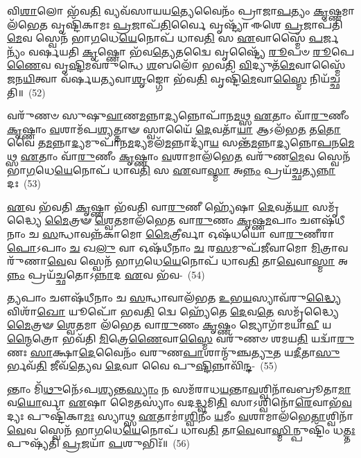 𑌵𑌿\-\ul{𑌶𑌾}\-𑌲𑍋 𑌭᳴𑌵\-\ul{𑌤𑌿} 𑌵𑍍𑌯𑌵᳴𑌸𑌾𑌯𑌯\-\ul{𑌤𑍍𑌯𑍇}\-𑌵𑍈𑌨𑌂᳴ 𑌪𑍍𑌰𑌾𑌜𑌾\-\ul{𑌪}\-𑌤𑍍𑌯𑌂 \ul{𑌕𑍃}\-𑌷𑍍𑌣𑌮𑌾\-𑌲᳴𑌭𑍇\-\ul{𑌤} 𑌵𑍃𑌷𑍍𑌟𑌿᳴𑌕𑌾𑌮𑌃 \ul{𑌪𑍍𑌰}\-𑌜𑌾𑌪᳴\-\ul{𑌤𑌿}\-𑌰𑍍𑌵𑍈 𑌵𑍃𑌷𑍍𑌟𑍍𑌯𑌾᳴ 𑌈𑌶𑍇 \ul{𑌪𑍍𑌰}\-𑌜𑌾𑌪᳴𑌤𑌿\-\ul{𑌮𑍇}\-𑌵 𑌸𑍍𑌵𑍇𑌨᳴ 𑌭𑌾\-\ul{𑌗}\-𑌧𑍇\-\ul{𑌯𑍇}\-𑌨𑍋𑌪᳴ 𑌧𑌾𑌵\-\ul{𑌤𑌿} 𑌸 \ul{𑌏}\-𑌵𑌾𑌸𑍍𑌮𑍈᳴ \ul{𑌪}\-𑌰𑍍𑌜𑌨𑍍𑌯𑌂᳴ 𑌵𑌰𑍍\mbox{}𑌷𑌯𑌤𑌿 \ul{𑌕𑍃}\-𑌷𑍍𑌣𑍋 𑌭᳴𑌵\-\ul{𑌤𑍍𑌯𑍇}\-𑌤𑌦𑍍𑌵𑍈 𑌵𑍃𑌷𑍍𑌟𑍍𑌯𑍈᳴ \ul{𑌰𑍂}\-𑌪𑍞 \ul{𑌰𑍂}\-𑌪𑍇\-\ul{𑌣𑍈}\-𑌵 𑌵𑍃\-\ul{𑌷𑍍𑌟𑌿}\-𑌮𑌵᳴\-𑌰𑍁𑌨𑍍𑌧𑍇 \ul{𑌶}\-𑌬𑌲𑍋᳴ 𑌭𑌵𑌤𑌿 \ul{𑌵𑌿}\-𑌦𑍍𑌯𑍁𑌤᳴\-\ul{𑌮𑍇}\-𑌵𑌾𑌸𑍍𑌮𑍈᳴ 𑌜𑌨\-\ul{𑌯𑌿}\-𑌤𑍍𑌵𑌾 𑌵᳴𑌰𑍍\mbox{}𑌷𑌯𑌤𑍍𑌯𑌵𑌾\-\ul{𑌶𑍃}\-𑌙𑍍𑌗𑍋 𑌭᳴𑌵\-\ul{𑌤𑌿} 𑌵𑍃𑌷𑍍𑌟𑌿᳴\-\ul{𑌮𑍇}\-𑌵𑌾\-\ul{𑌸𑍍𑌮𑍈} 𑌨𑌿𑌯᳴𑌚𑍍𑌛𑌤𑌿॥~(52)

{\anuvakamend[\-\ul{𑌶𑍃}\-𑌣𑌾𑌤𑌿᳴ 𑌮𑌿\-\ul{𑌥𑍁}\-𑌨𑌾𑌨𑌾॑𑌨𑍍𑌨𑌯𑌤𑌿 𑌯𑌚𑍍𑌛𑌤𑌿॥]}

𑌵𑌰𑍁᳴𑌣𑍞 𑌸𑍁𑌷𑍁\-\ul{𑌵𑌾}\-𑌣\-\ul{𑌮}\-𑌨𑍍𑌨𑌾\-\ul{𑌦𑍍𑌯}\-𑌨𑍍𑌨𑍋𑌪𑌾᳴𑌨\-\ul{𑌮}\-𑌥𑍍𑌸 \ul{𑌏}\-𑌤𑌾𑌂 𑌵𑌾᳴\-\ul{𑌰𑍁}\-𑌣𑍀𑌂 \ul{𑌕𑍃}\-𑌷𑍍𑌣𑌾𑌂 \ul{𑌵}\-𑌶𑌾𑌮᳴𑌪\-\ul{𑌶𑍍𑌯}\-𑌤𑍍𑌤𑌾𑍟 𑌸𑍍𑌵𑌾𑌯𑍈᳴ \ul{𑌦𑍇}\-𑌵𑌤𑌾᳴\-\ul{𑌯𑌾} 𑌆\-𑌽𑌲᳴𑌭\-\ul{𑌤} 𑌤\-\ul{𑌤𑍋} 𑌵𑍈 𑌤\-\ul{𑌮}\-𑌨𑍍𑌨𑌾\-\ul{𑌦𑍍𑌯}\-𑌮𑍁𑌪𑌾᳴𑌨\-\ul{𑌮}\-𑌦𑍍𑌯𑌮𑌲᳴\-\ul{𑌮}\-𑌨𑍍𑌨𑌾𑌦𑍍𑌯𑌾᳴\-\ul{𑌯} 𑌸𑌨𑍍𑌤᳴\-\ul{𑌮}\-𑌨𑍍𑌨𑌾\-\ul{𑌦𑍍𑌯}\-𑌨𑍍𑌨𑍋\-\ul{𑌪}\-𑌨\-\ul{𑌮𑍇}\-𑌥𑍍𑌸 \ul{𑌏}\-𑌤𑌾𑌂 𑌵𑌾᳴\-\ul{𑌰𑍁}\-𑌣𑍀𑌂 \ul{𑌕𑍃}\-𑌷𑍍𑌣𑌾𑌂 \ul{𑌵}\-𑌶𑌾𑌮𑌾\-𑌲᳴𑌭𑍇\-\ul{𑌤} 𑌵𑌰𑍁᳴𑌣\-\ul{𑌮𑍇}\-𑌵 𑌸𑍍𑌵𑍇𑌨᳴ 𑌭𑌾\-\ul{𑌗}\-𑌧𑍇\-\ul{𑌯𑍇}\-𑌨𑍋𑌪᳴ 𑌧𑌾𑌵\-\ul{𑌤𑌿} 𑌸 \ul{𑌏}\-𑌵𑌾\-\ul{𑌸𑍍𑌮𑌾} 𑌅\-\ul{𑌨𑍍𑌨𑌂} 𑌪𑍍𑌰𑌯᳴𑌚𑍍𑌛𑌤𑍍𑌯\-\ul{𑌨𑍍𑌨𑌾}\-𑌦𑌃~(53)

\-\ul{𑌏}\-𑌵 𑌭᳴𑌵𑌤𑌿 \ul{𑌕𑍃}\-𑌷𑍍𑌣𑌾 𑌭᳴𑌵𑌤𑌿 𑌵𑌾\-\ul{𑌰𑍁}\-𑌣𑍀 𑌹𑍍𑌯𑍇᳴𑌷𑌾 \ul{𑌦𑍇}\-𑌵𑌤᳴\-\ul{𑌯𑌾} 𑌸𑌮𑍃᳴𑌦𑍍𑌧𑍍𑌯𑍈 \ul{𑌮𑍈}\-𑌤𑍍𑌰𑍟 \ul{𑌶𑍍𑌵𑍇}\-𑌤𑌮𑌾𑌲᳴𑌭𑍇𑌤 𑌵𑌾\-\ul{𑌰𑍁}\-𑌣𑌂 \ul{𑌕𑍃}\-𑌷𑍍𑌣\-\ul{𑌮}\-𑌪𑌾𑌂 𑌚𑍗𑌷᳴𑌧𑍀𑌨𑌾𑌂 𑌚 \ul{𑌸}\-𑌨𑍍𑌧𑌾𑌵𑌨𑍍𑌨᳴𑌕𑌾𑌮𑍋 \ul{𑌮𑍈}\-𑌤𑍍𑌰𑍀𑌰𑍍𑌵𑌾 𑌓𑌷᳴𑌧𑌯𑍋 𑌵𑌾\-\ul{𑌰𑍁}\-𑌣𑍀𑌰𑌾\-\ul{𑌪𑍋}\-\-𑌽𑌪𑌾𑌂 \ul{𑌚} 𑌖\-\ul{𑌲𑍁} 𑌵𑌾 𑌓𑌷᳴𑌧𑍀𑌨𑌾𑌂 \ul{𑌚} 𑌰\-\ul{𑌸}\-𑌮𑍁𑌪᳴𑌜𑍀𑌵𑌾𑌮𑍋 \ul{𑌮𑌿}\-𑌤𑍍𑌰𑌾𑌵𑌰𑍁᳴𑌣𑌾\-\ul{𑌵𑍇}\-𑌵 𑌸𑍍𑌵𑍇𑌨᳴ 𑌭𑌾\-\ul{𑌗}\-𑌧𑍇\-\ul{𑌯𑍇}\-𑌨𑍋𑌪᳴ 𑌧𑌾𑌵\-\ul{𑌤𑌿} 𑌤𑌾\-\ul{𑌵𑍇}\-𑌵𑌾\-\ul{𑌸𑍍𑌮𑌾} 𑌅\-\ul{𑌨𑍍𑌨𑌂} 𑌪𑍍𑌰𑌯᳴𑌚𑍍𑌛𑌤𑍋\-𑌽\-\ul{𑌨𑍍𑌨𑌾}\-𑌦 \ul{𑌏}\-𑌵 𑌭᳴𑌵-~(54)

\-\ul{𑌤𑍍𑌯}\-𑌪𑌾𑌂 𑌚𑍗𑌷᳴𑌧𑍀𑌨𑌾𑌂 𑌚 \ul{𑌸}\-𑌨𑍍𑌧𑌾𑌵𑌾𑌲᳴𑌭𑌤 \ul{𑌉}\-𑌭\-\ul{𑌯}\-𑌸𑍍𑌯𑌾𑌵᳴𑌰𑍁\-\ul{𑌦𑍍𑌧𑍍𑌯𑍈} 𑌵𑌿𑌶𑌾᳴\-\ul{𑌖𑍋} 𑌯𑍂𑌪𑍋᳴ 𑌭𑌵\-\ul{𑌤𑌿} 𑌦𑍍𑌵𑍇 𑌹𑍍𑌯𑍇᳴𑌤𑍇 \ul{𑌦𑍇}\-𑌵\-\ul{𑌤𑍇} 𑌸𑌮𑍃᳴𑌦𑍍𑌧𑍍𑌯𑍈 \ul{𑌮𑍈}\-𑌤𑍍𑌰𑍟 \ul{𑌶𑍍𑌵𑍇}\-𑌤𑌮𑌾 𑌲᳴𑌭𑍇𑌤 𑌵𑌾\-\ul{𑌰𑍁}\-𑌣𑌂 \ul{𑌕𑍃}\-𑌷𑍍𑌣𑌂 𑌜𑍍𑌯𑍋𑌗𑌾᳴𑌮𑌯𑌾\-\ul{𑌵𑍀} 𑌯\-\ul{𑌨𑍍𑌮𑍈}\-𑌤𑍍𑌰𑍋 𑌭𑌵᳴𑌤𑌿 \ul{𑌮𑌿}\-𑌤𑍍𑌰𑍇\-\ul{𑌣𑍈}\-𑌵𑌾\-\ul{𑌸𑍍𑌮𑍈} 𑌵𑌰𑍁᳴𑌣𑍞 𑌶𑌮𑌯\-\ul{𑌤𑌿} 𑌯𑌦𑍍𑌵𑌾᳴\-\ul{𑌰𑍁}\-𑌣𑌃 \ul{𑌸𑌾}\-𑌕𑍍𑌷𑌾\-\ul{𑌦𑍇}\-𑌵𑍈𑌨𑌂᳴ 𑌵𑌰𑍁𑌣\-\-\ul{𑌪𑌾}\-𑌶𑌾𑌨𑍍𑌮𑍁᳴𑌞𑍍𑌚\-\ul{𑌤𑍍𑌯𑍁}\-𑌤 𑌯\-\ul{𑌦𑍀}\-𑌤𑌾\-\ul{𑌸𑍁}\-𑌰𑍍𑌭𑌵᳴\-\ul{𑌤𑌿} 𑌜𑍀𑌵᳴\-\ul{𑌤𑍍𑌯𑍇}\-𑌵 \ul{𑌦𑍇}\-𑌵𑌾 𑌵𑍈 𑌪𑍁\-\ul{𑌷𑍍𑌟𑌿}\-𑌨𑍍𑌨𑌾𑌵𑌿᳴\-\ul{𑌨𑍍𑌦}\--~(55)

𑌨𑍍𑌤𑌾𑌂 𑌮𑌿᳴\-\ul{𑌥𑍁}\-𑌨𑍇᳴\-𑌽𑌪\-\ul{𑌶𑍍𑌯}\-𑌨𑍍𑌤\-\ul{𑌸𑍍𑌯𑌾𑌂} 𑌨 𑌸𑌮᳴𑌰𑌾𑌧\-\ul{𑌯}\-𑌨𑍍𑌤𑌾\-\ul{𑌵}\-𑌶𑍍𑌵𑌿𑌨𑌾᳴\-𑌵𑌬𑍍𑌰𑍂𑌤𑌾\-\ul{𑌮𑌾}\-𑌵\-\ul{𑌯𑍋}\-𑌰𑍍𑌵𑌾 \ul{𑌏}\-𑌷𑌾 𑌮𑍈𑌤𑌸𑍍𑌯𑌾𑌂॑ 𑌵𑌦\-\ul{𑌦𑍍𑌧𑍍𑌵}\-𑌮𑌿\-\ul{𑌤𑌿} 𑌸𑌾\-𑌽𑌶𑍍𑌵𑌿𑌨𑍋᳴\-\ul{𑌰𑍇}\-𑌵𑌾𑌭᳴\-\ul{𑌵}\-𑌦𑍍𑌯𑌃 𑌪𑍁𑌷𑍍𑌟𑌿᳴𑌕𑌾\-\ul{𑌮𑌃} 𑌸𑍍𑌯𑌾𑌥𑍍𑌸 \ul{𑌏}\-𑌤𑌾𑌮𑌾॑\-\ul{𑌶𑍍𑌵𑌿}\-𑌨𑍀𑌂 \ul{𑌯}\-𑌮𑍀𑌂 \ul{𑌵}\-𑌶𑌾𑌮𑌾𑌲᳴𑌭𑍇\-\ul{𑌤𑌾}\-𑌶𑍍𑌵𑌿𑌨𑌾᳴\-\ul{𑌵𑍇}\-𑌵 𑌸𑍍𑌵𑍇𑌨᳴ 𑌭𑌾\-\ul{𑌗}\-𑌧𑍇\-\ul{𑌯𑍇}\-𑌨𑍋𑌪᳴ 𑌧𑌾𑌵\-\ul{𑌤𑌿} 𑌤𑌾\-\ul{𑌵𑍇}\-𑌵𑌾\-\ul{𑌸𑍍𑌮𑌿}\-𑌨𑍍𑌪𑍁𑌷𑍍𑌟𑌿𑌂᳴ 𑌧\-\ul{𑌤𑍍𑌤𑌃} 𑌪𑍁𑌷𑍍𑌯᳴𑌤𑌿 \ul{𑌪𑍍𑌰}\-𑌜𑌯𑌾᳴ \ul{𑌪}\-𑌶𑍁𑌭𑌿𑌃᳴॥~(56)

